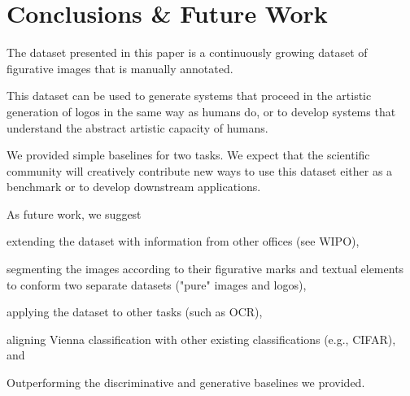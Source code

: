 \documentclass{article}
\begin{document}
\section{Conclusions \& Future Work}
The dataset presented in this paper is a continuously growing dataset of figurative images that is manually annotated.

This dataset can be used to generate systems that proceed in the artistic generation of logos in the same way as humans do, or to develop systems that understand the abstract artistic capacity of humans.

We provided simple baselines for two tasks. We expect that the scientific community will creatively contribute new ways to use this dataset either as a benchmark or to develop downstream applications.

As future work, we suggest \begin{enumerate*}
    \item extending the dataset with information from other offices (see WIPO), \item segmenting the images according to their figurative marks and textual elements to conform two separate datasets ("pure" images and logos), \item applying the dataset to other tasks (such as OCR), \item aligning Vienna classification with other existing classifications (e.g., CIFAR), and \item Outperforming the discriminative and generative baselines we provided.
\end{enumerate*}


  

\clearpage

\end{document}

